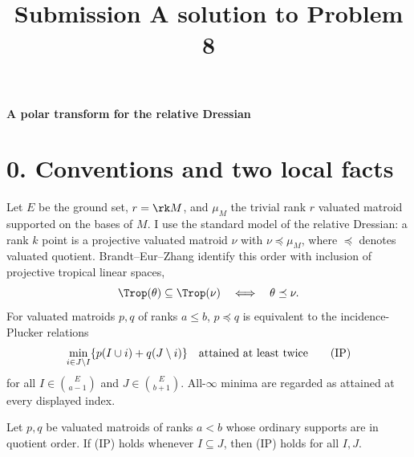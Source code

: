 \title{Submission A solution to Problem 8}
\date{}
\maketitle

\begin{center}
{\bf A polar transform for the relative Dressian}
\end{center}

\section*{0. Conventions and two local facts}

Let $E$ be the ground set, $r=\rk M$, and $\mu_M$ the trivial rank $r$
valuated matroid supported on the bases of $M$.  I use the standard
model of the relative Dressian: a rank $k$ point is a projective
valuated matroid $\nu$ with $\nu\preceq\mu_M$, where $\preceq$ denotes
valuated quotient.  Brandt--Eur--Zhang \cite{BEZ} identify this order with
inclusion of projective tropical linear spaces,
\[
        \Trop(\theta)\subseteq\Trop(\nu)
        \quad\Longleftrightarrow\quad \theta\preceq\nu .
\]
For valuated matroids $p,q$ of ranks $a\le b$, $p\preceq q$ is
equivalent to the incidence-Plucker relations
\[
 \min_{i\in J\setminus I}\{p(I\cup i)+q(J\setminus i)\}
 \quad\hbox{attained at least twice}                         \tag{IP}
\]
for all $I\in\binom{E}{a-1}$ and $J\in\binom{E}{b+1}$.  All-$\infty$
minima are regarded as attained at every displayed index.

\begin{criterion}\label{crit:local}
Let $p,q$ be valuated matroids of ranks $a<b$ whose ordinary supports
are in quotient order.  If {\rm (IP)} holds whenever $I\subseteq J$,
then {\rm (IP)} holds for all $I,J$.
\end{criterion}

